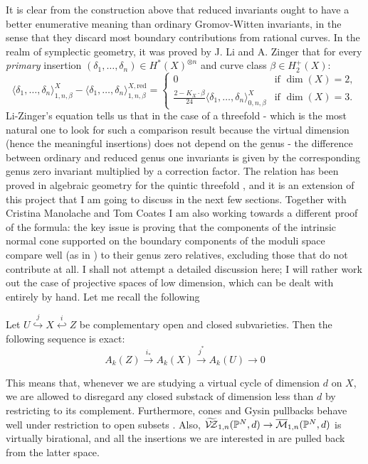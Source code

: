 It is clear from the construction above that reduced invariants ought to have a better enumerative meaning than ordinary Gromov-Witten invariants, in the sense that they discard most boundary contributions from rational curves. In the realm of symplectic geometry, it was proved by J. Li and A. Zinger \cite{LZ} that for every \emph{primary} insertion $(\delta_1,\ldots,\delta_n)\in H^*(X)^{\otimes n}$ and curve class $\beta\in H^+_2(X)$:
\[
 \langle \delta_1,\ldots,\delta_n \rangle^X_{1,n,\beta}-\langle \delta_1,\ldots,\delta_n \rangle^{X,\mathrm{red}}_{1,n,\beta}=\begin{cases}
 0 & \text{if } \dim(X)=2, \\
 \frac{2-K_X\cdot\beta}{24}\langle \delta_1,\ldots,\delta_n \rangle^X_{0,n,\beta} & \text{if } \dim(X)=3.\end{cases}
\]
Li-Zinger's equation tells us that in the case of a threefold - which is the most natural one to look for such a comparison result because the virtual dimension (hence the meaningful insertions) does not depend on the genus - the difference between ordinary and reduced genus one invariants is given by the corresponding genus zero invariant multiplied by a correction factor. The relation has been proved in algebraic geometry for the quintic threefold \cite{CL}, and it is an extension of this project that I am going to discuss in the next few sections. Together with Cristina Manolache and Tom Coates I am also working towards a different proof of the formula: the key issue is proving that the components of the intrinsic normal cone supported on the boundary components of the moduli space compare well (as in \cite{Manolache-Push}) to their genus zero relatives, excluding those that do not contribute at all. I shall not attempt a detailed discussion here; I will rather work out the case of projective spaces of low dimension, which can be dealt with entirely by hand. Let me recall the following
\begin{lemma}\cite[Proposition 1.8]{Ful}
Let $U\overset{j}{\hookrightarrow} X \overset{i}{\hookleftarrow} Z$ be complementary open and closed subvarieties. Then the following sequence is exact:
\[A_k(Z)\overset{i_*}{\to} A_k(X)\overset{j^*}{\to} A_k(U)\to 0\]
\end{lemma}
This means that, whenever we are studying a virtual cycle of dimension $d$ on $X$, we are allowed to disregard any closed substack of dimension less than $d$ by restricting to its complement. Furthermore, cones and Gysin pullbacks behave well under restriction to open subsets \cite[Proposition 4.2(b) and Theorem 6.2(b)]{Ful}. Also, $\widetilde{\mathcal{V\!Z}}_{1,n}(\mathbb P^N,d)\rightarrow \overline{\mathcal{M}}_{1,n}(\mathbb P^N,d)$ is virtually birational, and all the insertions we are interested in are pulled back from the latter space.  

